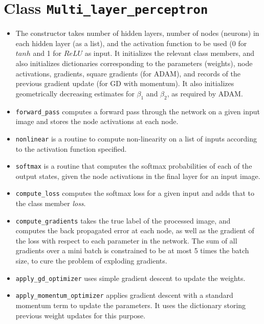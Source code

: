 \documentclass[12pt, a4paper]{article}
\begin{document}
\section{Class \texttt{Multi\_layer\_perceptron}}
\begin{itemize}
\item The constructor takes number of hidden layers, number of nodes (neurons) in each hidden layer (as a list), and the activation function to be used (0 for $tanh$ and 1 for $ReLU$ as input. It initializes the relevant class members, and also initializes dictionaries corresponding to the parameters (weights), node activations, gradients, square gradients (for ADAM), and records of the previous gradient update (for GD with momentum). It also initializes geometrically decreasing estimates for $\beta_1$ and $\beta_2$, as required by ADAM. 

\item \texttt{forward\_pass} computes a forward pass through the network on a given input image and stores the node activations at each node.

\item \texttt{nonlinear} is a routine to compute non-linearity on a list of inputs according to the activation function specified.

\item \texttt{softmax} is a routine that computes the softmax probabilities of each of the output states, given the node activations in the final layer for an input image. 

\item \texttt{compute\_loss} computes the softmax loss for a given input and adds that to the class member \textit{loss}.

\item \texttt{compute\_gradients} takes the true label of the processed image, and computes the back propagated error at each node, as well as the gradient of the loss with respect to each parameter in the network. The sum of all gradients over a mini batch is constrained to be at most 5 times the batch size, to cure the problem of exploding gradients. 

\item \texttt{apply\_gd\_optimizer} uses simple gradient descent to update the weights.

\item \texttt{apply\_momentum\_optimizer} applies gradient descent with a standard momentum term to update the parameters. It uses the dictionary storing previous weight updates for this purpose. 


\end{itemize}
\end{document}
